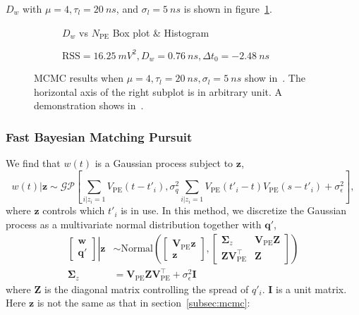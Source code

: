 $D_w$ with $\mu=4, \tau_l=\SI{20}{ns}$, and $\sigma_l=\SI{5}{ns}$ is shown in figure~\ref{fig:mcmc-npe}.
\begin{figure}[H]
  \begin{subfigure}{.5\textwidth}
    \centering
    \resizebox{\textwidth}{!}{}
    \caption{\label{fig:mcmc-npe} $D_w$ vs $N_{\mathrm{PE}}$ Box plot \& Histogram}
  \end{subfigure}
  \begin{subfigure}{.5\textwidth}
    \centering
    \resizebox{\textwidth}{!}{}
    \caption{\label{fig:mcmc}$\mathrm{RSS}=\SI{16.25}{mV^2},D_w=\SI{0.76}{ns},\Delta{t_0}=\SI{-2.48}{ns}$}
  \end{subfigure}
  \caption{MCMC results when $\mu=4, \tau_l=\SI{20}{ns}, \sigma_l=\SI{5}{ns}$ show in~. The horizontal axis of the right subplot is in arbitrary unit. A demonstration shows in~.}
\end{figure}

\subsubsection{Fast Bayesian Matching Pursuit}
\label{subsec:fbmp}
We find that $w(t)$ is a Gaussian process subject to $\bm{z}$,
\begin{equation}
    w(t)|\bm{z} \sim \mathcal{GP}\left[\sum_{i|z_i=1}V_\mathrm{PE}(t-t'_i), \sigma_q^2 \sum_{i|z_i=1}V_\mathrm{PE}(t'_i-t)V_\mathrm{PE}(s-t'_i) + \sigma_\epsilon^2 \right],
\end{equation}
where $\bm{z}$ controls which $t'_i$ is in use. In this method, we discretize the Gaussian process as a multivariate normal distribution together with $\bm{q}'$, 
\begin{equation}
\label{eq:mgauss}
\begin{aligned}
    \left.
    \begin{bmatrix}
        \bm{w} \\
        \bm{q}'
    \end{bmatrix}
    \right\vert\bm{z}
    &\sim \mathrm{Normal}\left(
    \begin{bmatrix}
        \bm{V}_\mathrm{PE}\bm{z} \\
        \bm{z}
    \end{bmatrix}, 
    \begin{bmatrix}
        \bm{\Sigma}_z & \bm{V}_\mathrm{PE}\bm{Z} \\
        \bm{Z}\bm{V}_\mathrm{PE}^\intercal & \bm{Z}
    \end{bmatrix}
    \right) \\
    \bm{\Sigma}_z &= \bm{V}_\mathrm{PE}\bm{Z}\bm{V}_\mathrm{PE}^\intercal+\sigma_\epsilon^2\bm{I}
\end{aligned}
\end{equation}
where $\bm{Z}$ is the diagonal matrix controlling the spread of $q'_i$. $\bm{I}$ is a unit matrix. Here $\bm{z}$ is not the same as that in section~\ref{subsec:mcmc}: 

